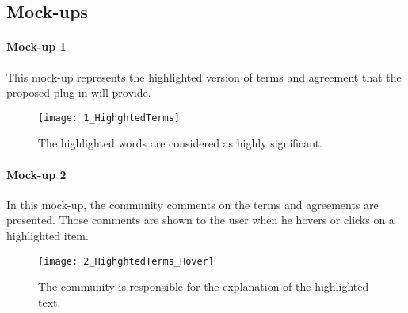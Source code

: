 \subsection{Mock-ups}

\paragraph{Mock-up 1}
This mock-up represents the highlighted version of terms and agreement that the 
proposed plug-in will provide.

\begin{figure}[H]
\centering
\texttt{[image: 1\_HighghtedTerms]}
\caption{The highlighted words are considered as highly significant.}
\end{figure}

\paragraph{Mock-up 2}
In this mock-up, the community comments on the terms and agreements are 
presented. Those comments are shown to the user when he hovers or clicks on a 
highlighted item.

\begin{figure}[H]
\centering
\texttt{[image: 2\_HighghtedTerms\_Hover]}
\caption{The community is responsible for the explanation of the highlighted 
text.}
\end{figure}


